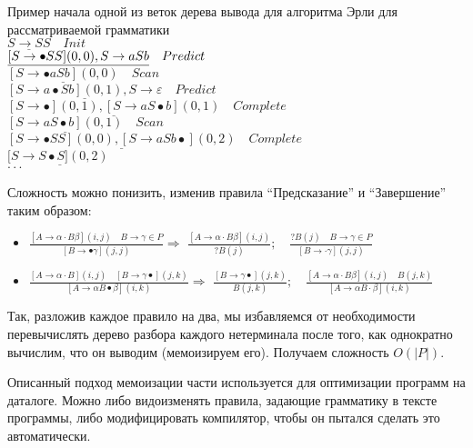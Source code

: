 \begin{example} Пример начала одной из веток дерева вывода для алгоритма Эрли для рассматриваемой грамматики\\
	
	$\underline{S \rightarrow SS} \quad Init$\\
	$\underline{[S \rightarrow \bullet SS](0,0), \space S \rightarrow aSb} \quad Predict$\\
	$\underline{[S \rightarrow \bullet aSb](0,0)} \quad Scan$\\
	$\underline{[S \rightarrow a \bullet Sb](0,1), S \rightarrow \varepsilon} \quad Predict$\\
	$\underline{[S \rightarrow \bullet](0, 1), [S \rightarrow aS \bullet b](0,1)} \quad Complete$\\
	$\underline{[S \rightarrow aS \bullet b](0,1)} \quad Scan$\\
	$\underline{[S \rightarrow \bullet SS](0,0),[S \rightarrow aSb \bullet](0,2)} \quad Complete$\\
	$[\underline{S \rightarrow S \bullet S](0,2)}$\\
	$\cdot\cdot\cdot$
	
\end{example}

Сложность можно понизить, изменив правила ``Предсказание'' и ``Завершение'' таким образом:
\begin{itemize}
	\item $\frac{[A \rightarrow \alpha \cdot B \beta](i, j) \quad B \rightarrow \gamma \in P}{[B \rightarrow \bullet \gamma](j, j)} \Rightarrow$ $
	\frac{[A \rightarrow \alpha \cdot B \beta](i, j)}{? B(j)}; \quad \frac{? B(j) \quad B \rightarrow \gamma \in P}{[B \rightarrow \cdot \gamma](j, j)}$
	\item $\frac{[A \rightarrow \alpha \cdot B](i, j) \quad[B \rightarrow \gamma \bullet](j, k)}{[A \rightarrow \alpha B \bullet \beta](i, k)} \Rightarrow$ $\frac{[B \rightarrow \gamma \bullet](j, k)}{B(j, k)}; \quad \frac{[A \rightarrow \alpha \cdot B \beta](i, j) \quad B(j, k)}{[A \rightarrow \alpha B \cdot \beta](i, k)}$
\end{itemize}
Так, разложив каждое правило на два, мы избавляемся от необходимости перевычислять дерево разбора каждого нетерминала после того, как однократно вычислим, что он выводим (мемоизируем его). Получаем сложность $O(|P|)$.

Описанный подход мемоизации\cite{Magic} части используется для оптимизации программ на даталоге. Можно либо видоизменять правила, задающие грамматику в тексте программы, либо модифицировать компилятор, чтобы он пытался сделать это автоматически. 